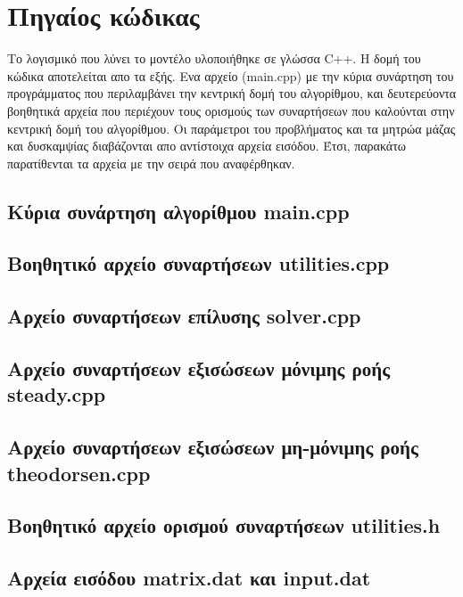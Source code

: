 \section{Πηγαίος κώδικας}

Το λογισμικό που λύνει το μοντέλο υλοποιήθηκε σε γλώσσα C++. Η δομή του κώδικα αποτελείται απο τα εξής. Ενα αρχείο (main.cpp) με την κύρια συνάρτηση του προγράμματος που περιλαμβάνει την κεντρική δομή του αλγορίθμου, και δευτερεύοντα βοηθητικά αρχεία που περιέχουν τους ορισμούς των συναρτήσεων που καλούνται στην κεντρική δομή του αλγορίθμου. Οι παράμετροι του προβλήματος και τα μητρώα μάζας και δυσκαμψίας διαβάζονται απο αντίστοιχα αρχεία εισόδου.
Έτσι, παρακάτω παρατίθενται τα αρχεία με την σειρά που αναφέρθηκαν.

\subsection{Κύρια συνάρτηση αλγορίθμου main.cpp}



\vspace{4.5cm}
\subsection{Βοηθητικό αρχείο συναρτήσεων utilities.cpp}



\vspace{3cm}
\subsection{Αρχείο συναρτήσεων επίλυσης solver.cpp}



\vspace{3cm}
\subsection{Αρχείο συναρτήσεων εξισώσεων μόνιμης ροής steady.cpp}


\vspace{3cm}
\subsection{Αρχείο συναρτήσεων εξισώσεων μη-μόνιμης ροής theodorsen.cpp}



\vspace{3cm}
\subsection{Βοηθητικό αρχείο ορισμού συναρτήσεων utilities.h}



\vspace{3cm}
\subsection{Αρχεία εισόδου matrix.dat και input.dat}

\label{AppLastPage}

\vspace{3cm}


